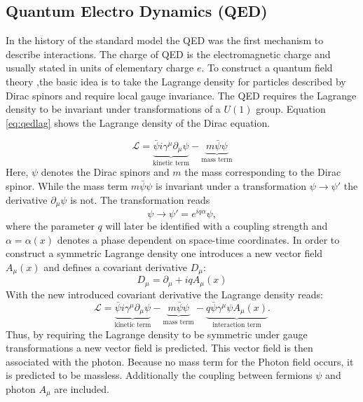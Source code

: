 	\subsection{Quantum Electro Dynamics (QED)}
	In the history of the standard model the QED was the first mechanism to describe interactions. The charge of QED is the electromagnetic charge and usually stated in units of elementary charge $e$. To construct a quantum field theory ,the basic idea is to take the Lagrange density for particles described by Dirac spinors and require local gauge invariance. The QED requires the Lagrange density to be invariant under transformations of a $U(1)$ group. Equation \ref{eq:qedlag} shows the Lagrange density of the Dirac equation. 
	
	\begin{equation}
	\mathcal{L} = \underbrace{\bar{\psi} i \gamma^\mu \partial_\mu \psi}_{\text{kinetic term}} - \underbrace{m \bar{\psi} \psi}_{\text{mass term}}
	\label{eq:qedlag}
	\end{equation}
	Here, $\psi$ denotes the Dirac spinors and $m$ the mass corresponding to the Dirac spinor. While the mass term $m \bar{\psi} \psi$ is invariant under a transformation $\psi \rightarrow \psi'$ the derivative $\partial_\mu \psi$ is not. The transformation reads
	\begin{equation}
	\psi \rightarrow \psi' = e^{i q \alpha} \psi,
	\label{eq:trafo}
	\end{equation}
	where the parameter $q$ will later be identified with a coupling strength and $\alpha = \alpha(x)$ denotes a phase dependent on space-time coordinates. In order to construct a symmetric Lagrange density one introduces a new vector field $A_\mu(x)$ and defines a covariant derivative $D_\mu$:
	\begin{equation}
	D_\mu = \partial_\mu + i q A_\mu(x)
	\end{equation}
	With the new introduced covariant derivative the Lagrange density reads:
	\begin{equation}
	\mathcal{L} = \underbrace{\bar{\psi} i \gamma^\mu \partial_\mu \psi}_{\text{kinetic term}} - \underbrace{m \bar{\psi} \psi}_{\text{mass term}} - \underbrace{q \bar{\psi} \gamma^\mu \psi A_\mu(x)}_{\text{interaction term}}.
	\end{equation}
	Thus, by requiring the Lagrange density to be symmetric under gauge transformations a new vector field is predicted. This vector field is then associated with the photon. Because no mass term for the Photon field occurs, it is predicted to be massless. Additionally the coupling between fermions $\psi$ and photon $A_\mu$ are included. \cite{ModernParticlePhysics}

